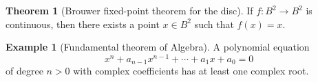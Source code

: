 \documentclass[12pt,a4paper]{book}
\newenvironment{prooff}{{\noindent\it\textcolor{cyan!40!black}{Proof}:}\,}{\par}
\theoremstyle{definition}
\newtheorem{theo}[defn]{Theorem}
\newtheorem{exam}[defn]{Example}
\begin{document}
\begin{theo}[Brouwer fixed-point theorem for the disc]
    If $f: B^2 \rightarrow B^2$ is continuous, then there exists a point $x \in B^2$ such that $f(x)=x$.
\end{theo}
\begin{exam}[Fundamental theorem of Algebra]
    A polynomial equation
    $$
        x^n+a_{n-1} x^{n-1}+\cdots+a_1 x+a_0=0
    $$
    of degree $n>0$ with complex coefficients has at least one complex root.
\end{exam}
\end{document}
